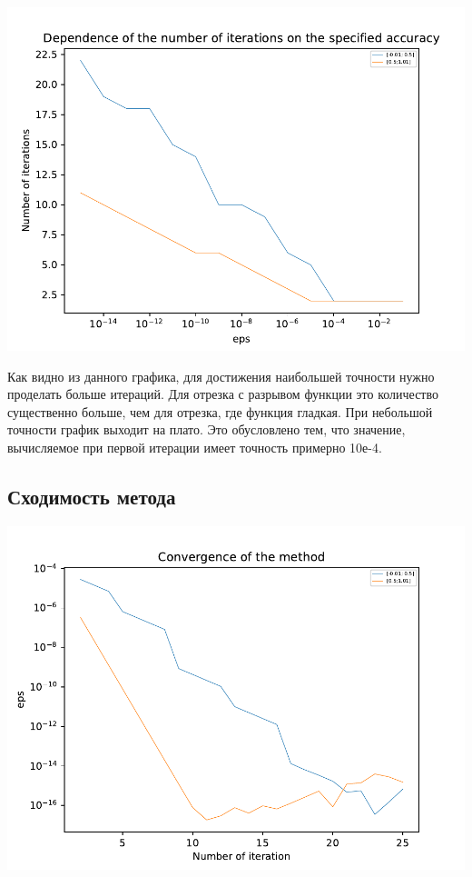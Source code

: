 \includegraphics[scale=0.75]{1.pdf}

Как видно из данного графика, для достижения наибольшей точности нужно проделать больше итераций. Для отрезка с разрывом функции это количество существенно больше, чем для отрезка, где функция гладкая. При небольшой точности график выходит на плато. Это обусловлено тем, что значение, вычисляемое при первой итерации имеет точность примерно 10е-4.

\subsection{Сходимость метода}

\includegraphics[scale=0.75]{2.pdf}

